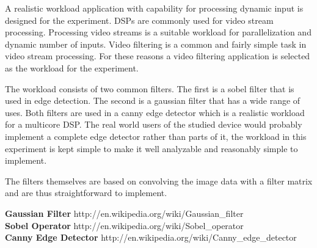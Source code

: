 A realistic workload application with capability for processing dynamic input is designed for the experiment. DSPs are commonly used for video stream processing. Processing video streams is a suitable workload for parallelization and dynamic number of inputs. Video filtering is a common and fairly simple task in video stream processing. For these reasons a video filtering application is selected as the workload for the experiment.

The workload consists of two common filters. The first is a sobel filter that is used in edge detection. The second is a gaussian filter that has a wide range of uses. Both filters are used in a canny edge detector which is a realistic workload for a multicore DSP. The real world users of the studied device would probably implement a complete edge detector rather than parts of it, the workload in this experiment is kept simple to make it well analyzable and reasonably simple to implement.

The filters themselves are based on convolving the image data with a filter matrix and are thus straightforward to implement.

\textbf{Gaussian Filter} http://en.wikipedia.org/wiki/Gaussian\_filter\\
\textbf{Sobel Operator} http://en.wikipedia.org/wiki/Sobel\_operator\\
\textbf{Canny Edge Detector} http://en.wikipedia.org/wiki/Canny\_edge\_detector\\